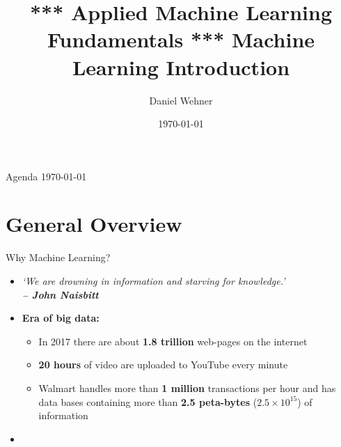 


\title[Machine Learning Introduction]{*** Applied Machine Learning Fundamentals *** Machine Learning Introduction}
\author{Daniel Wehner}
\date{\today}




\maketitlepage


\begin{frame}{Agenda \today}
	\begin{multicols}{2}
		\tableofcontents
	\end{multicols}
\end{frame}



\section{General Overview}

\begin{frame}{Why Machine Learning?}{}
	\begin{itemize}
		\item \textit{`We are drowning in information and starving for knowledge.' \\
			\hfill\textbf{-- John Naisbitt}}
		\item \textbf{Era of big data:}
		\begin{itemize}
			\item In 2017 there are about \textbf{1.8 trillion} web-pages on the internet
			\item \textbf{20 hours} of video are uploaded to YouTube every minute
			\item Walmart handles more than \textbf{1 million} transactions per hour and has data bases containing more 
				than \textbf{2.5 peta-bytes} ($2.5 \times 10^15$) of information
		\end{itemize}
		\item {}
	\end{itemize}
\end{frame}


